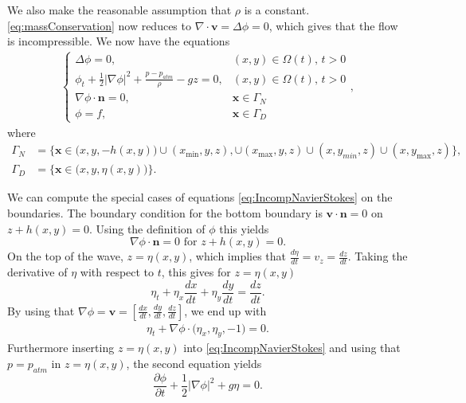 \documentclass[11pt]{article}
\begin{document}
We also make the reasonable assumption that $\rho$ is a constant. \eqref{eq:massConservation} now reduces to
$\nabla \cdot \bm{v} = \Delta \phi = 0$, which gives that the flow is incompressible. We now have
the equations
\begin{align}
    \label{eq:IncompNavierStokes}
    \begin{cases}
        \Delta \phi = 0,                                                 &    (x,y) \in \Omega(t), \, t > 0 \\
        \phi_t + \frac{1}{2}|\nabla \phi|^2 + \frac{p-p_{atm}}{\rho} - g z = 0,
                                                                         &    (x,y) \in \Omega(t), \, t > 0 \\
        \nabla \phi \cdot \bm{n} = 0,                                    &    \bm{x} \in \Gamma_N \\
        \phi = f,                                                        &    \bm{x} \in \Gamma_D
    \end{cases},
\end{align}
where
\begin{align*}
    \Gamma_N & = \big\{\bm{x} \in \big(x,y,-h(x,y)\big) \cup (x_{\min}, y, z), \cup (x_{\max}, y, z) \cup (x, y_{min}, z) \cup (x, y_{\max}, z)\big\}, \\
    \Gamma_D & = \big\{ \bm{x} \in \big(x,y, \eta(x,y)\big) \big\}.
\end{align*}

We can compute the special cases of equations \eqref{eq:IncompNavierStokes} on the boundaries. 
The boundary condition for the bottom boundary is $\bm{v} \cdot \bm{n} = 0 $ on $z + h(x,y) = 0$. Using the definition of $\phi$ this yields
\begin{equation}
    \label{eq:phit}%
    \nabla \phi  \cdot \bm{n} = 0 \text{ for } z + h(x,y) = 0. 
\end{equation}
On the top of the wave, $z = \eta(x,y)$, which implies that $\frac{d\eta}{dt} = v_z = \frac{dz}{dt}$. Taking the derivative of $\eta$ with respect to $t$, this gives for $z = \eta(x,y)$
\begin{equation*}
    \eta_t + \eta_x\frac{dx}{dt} + \eta_y\frac{dy}{dt} = \frac{dz}{dt}. 
\end{equation*}
By using that $\nabla\phi = \bm{v} = [\frac{dx}{dt}, \frac{dy}{dt}, \frac{dz}{dt}]$, we end up with
\begin{align}
    \label{eq:etaEq}%
    \eta_t + \nabla\phi\cdot \big(\eta_x, \eta_y, - 1\big) = 0.
\end{align}
Furthermore inserting $z = \eta(x,y)$ into \eqref{eq:IncompNavierStokes} and using that $p = p_{atm}$ in $z = \eta(x,y)$, the second equation yields
\begin{equation}
    \label{eq:phiEq}
    \frac{\partial \phi }{\partial t} + \frac{1}{2}|\nabla \phi |^2 + g\eta = 0.
\end{equation}
%
%
\end{document}
